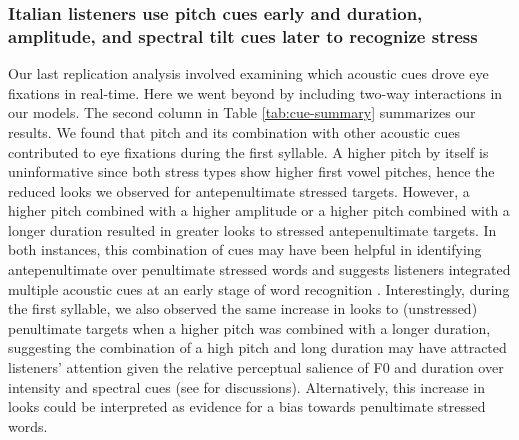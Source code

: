 \subsubsection{Italian listeners use pitch cues early and duration, amplitude, and spectral tilt cues later to recognize stress}
Our last replication analysis involved examining which acoustic cues drove eye fixations in real-time. Here we went beyond \cite{Sulpizio_McQueen_2012} by including two-way interactions in our models. The second column in Table \ref{tab:cue-summary} summarizes our results. We found that pitch and its combination with other acoustic cues contributed to eye fixations during the first syllable. A higher pitch by itself is uninformative since both stress types show higher first vowel pitches, hence the reduced looks we observed for antepenultimate stressed targets. However, a higher pitch combined with a higher amplitude or a higher pitch combined with a longer duration resulted in greater looks to stressed antepenultimate targets. In both instances, this combination of cues may have been helpful in identifying antepenultimate over penultimate stressed words and suggests listeners integrated multiple acoustic cues at an early stage of word recognition \citep{Kong2016, mcmurray_2008}. Interestingly, during the first syllable, we also observed the same increase in looks to (unstressed) penultimate targets when a higher pitch was combined with a longer duration, suggesting the combination of a high pitch and long duration may have attracted listeners' attention given the relative perceptual salience of F0 and duration over intensity and spectral cues (see \cite{ip2022search, beckman2012stress} for discussions). Alternatively, this increase in looks could be interpreted as evidence for a bias towards penultimate stressed words. 


